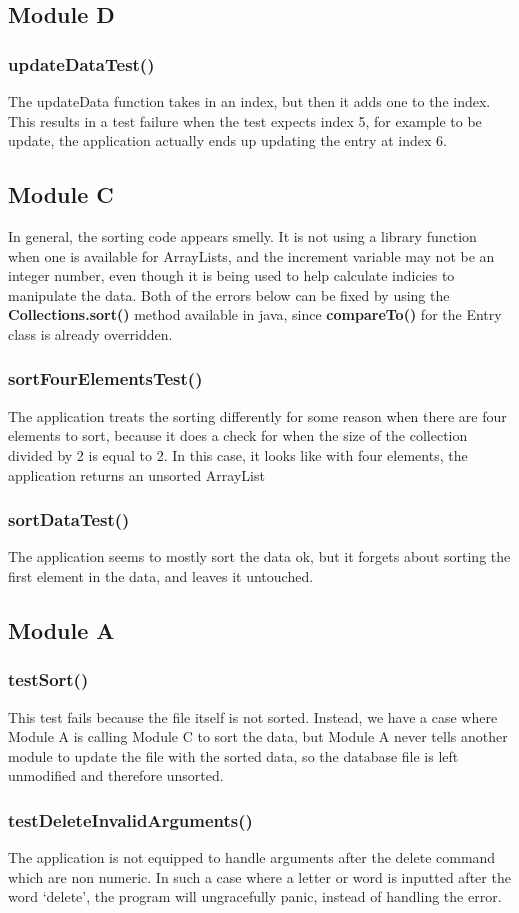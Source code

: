 \subsection{Module D}
\subsubsection{updateDataTest()}
The updateData function takes in an index, but then it adds one to the index.
This results in a test failure when the test expects index 5, for example to be
update, the application actually ends up updating the entry at index 6.

\subsection{Module C}
In general, the sorting code appears smelly. It is not using a library function
when one is available for ArrayLists, and the increment variable may not be an
integer number, even though it is being used to help calculate indicies to
manipulate the data. Both of the errors below can be fixed by using the
\textbf{Collections.sort()} method available in java, since \textbf{compareTo()}
for the Entry class is already overridden.
\subsubsection{sortFourElementsTest()}
The application treats the sorting differently for some reason when there are
four elements to sort, because it does a check for when the size of the
collection divided by 2 is equal to 2. In this case, it looks like with four
elements, the application returns an unsorted ArrayList

\subsubsection{sortDataTest()}
The application seems to mostly sort the data ok, but it forgets about sorting
the first element in the data, and leaves it untouched.

\subsection{Module A}
\subsubsection{testSort()}
This test fails because the file itself is not sorted. Instead, we have a case
where Module A is calling Module C to sort the data, but Module A never tells
another module to update the file with the sorted data, so the database file is
left unmodified and therefore unsorted.

\subsubsection{testDeleteInvalidArguments()}
The application is not equipped to handle arguments after the delete command
which are non numeric. In such a case where a letter or word is inputted after
the word `delete', the program will ungracefully panic, instead of handling the
error.

